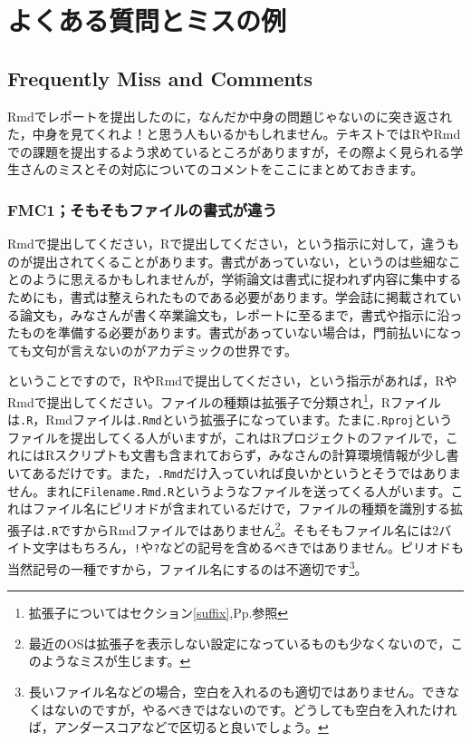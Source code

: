 \documentclass{ltjsbook}
\begin{document}
\VerbatimFootnotes

\chapter{よくある質問とミスの例}
\section{Frequently Miss and Comments}

Rmdでレポートを提出したのに，なんだか中身の問題じゃないのに突き返された，中身を見てくれよ！と思う人もいるかもしれません。テキストではRやRmdでの課題を提出するよう求めているところがありますが，その際よく見られる学生さんのミスとその対応についてのコメントをここにまとめておきます。

\subsection{FMC1；そもそもファイルの書式が違う}
Rmdで提出してください，Rで提出してください，という指示に対して，違うものが提出されてくることがあります。書式があっていない，というのは些細なことのように思えるかもしれませんが，学術論文は書式に捉われず内容に集中するためにも，書式は整えられたものである必要があります。学会誌に掲載されている論文も，みなさんが書く卒業論文も，レポートに至るまで，書式や指示に沿ったものを準備する必要があります。書式があっていない場合は，門前払いになっても文句が言えないのがアカデミックの世界です。

ということですので，RやRmdで提出してください，という指示があれば，RやRmdで提出してください。ファイルの種類は拡張子で分類され\footnote{拡張子についてはセクション\ref{suffix},Pp.\pageref{suffix}参照}，Rファイルは\verb|.R|，Rmdファイルは\verb|.Rmd|という拡張子になっています。たまに\verb|.Rproj|というファイルを提出してくる人がいますが，これはRプロジェクトのファイルで，これにはRスクリプトも文書も含まれておらず，みなさんの計算環境情報が少し書いてあるだけです。また，\verb|.Rmd|だけ入っていれば良いかというとそうではありません。まれに\verb|Filename.Rmd.R|というようなファイルを送ってくる人がいます。これはファイル名にピリオドが含まれているだけで，ファイルの種類を識別する拡張子は\verb|.R|ですからRmdファイルではありません\footnote{最近のOSは拡張子を表示しない設定になっているものも少なくないので，このようなミスが生じます。}。そもそもファイル名には2バイト文字はもちろん，\verb|!|や\verb|?|などの記号を含めるべきではありません。ピリオドも当然記号の一種ですから，ファイル名にするのは不適切です\footnote{長いファイル名などの場合，空白を入れるのも適切ではありません。できなくはないのですが，やるべきではないのです。どうしても空白を入れたければ，アンダースコアなどで区切ると良いでしょう。}。
\end{document}
